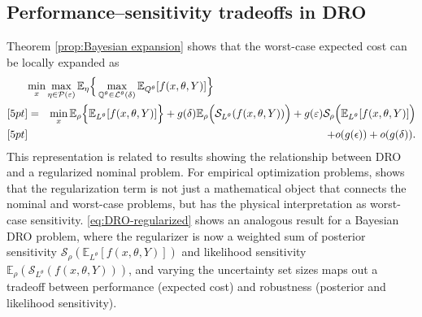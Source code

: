 \documentclass[10pt,a4paper]{amsart}
\newtheorem{remark}[theorem]{Remark}
\numberwithin{equation}{section}
\numberwithin{theorem}{section}
\numberwithin{table}{section}
\numberwithin{figure}{section}
\begin{document}
\subsection{Performance--sensitivity tradeoffs in DRO}
\label{sec:DROtradeoff}

Theorem \ref{prop:Bayesian expansion} shows that the  worst-case expected cost can be locally expanded as
\begin{eqnarray}
\lefteqn{\min_x \max_{\eta \in {\mathcal P}(\varepsilon)} {\mathbb E}_\eta \Big\{\max_{{\mathbb Q}^\theta \in {\mathcal L}^\theta(\delta)} {\mathbb E}_{Q^\theta} [f(x, \theta, Y)] \Big\}}
\label{eq:DRO-regularized}
\\ [5pt]
& = & \min_x {\mathbb E}_\rho\Big\{{\mathbb E}_{L^\theta}[f(x, \theta, Y)]\Big\}+ g(\delta) {\mathbb E}_\rho \Big({\mathcal S}_{L^\theta}(f(x, \theta, Y))\Big) + g(\varepsilon)  {\mathcal S}_\rho\Big({\mathbb E}_{L^\theta}[f(x, \theta, Y)]\Big) 
\nonumber  \\ [5pt] 
& & + o(g({\epsilon})) + o(g({\delta})).
\nonumber
\end{eqnarray}
This representation is related to results showing the relationship between DRO and a regularized nominal problem. For empirical optimization problems, \cite{gotoh2026sensitivity} shows that the regularization term is not just a mathematical object that connects the nominal and worst-case problems, but  has the physical interpretation as worst-case sensitivity. \eqref{eq:DRO-regularized} shows an analogous result for a Bayesian DRO problem, where the regularizer is now a weighted sum of posterior  sensitivity ${\mathcal S}_\rho({\mathbb E}_{L^\theta}[f(x, \theta, Y)])$   and likelihood sensitivity ${\mathbb E}_\rho ({\mathcal S}_{L^\theta}(f(x, \theta, Y)))$, and varying the uncertainty set sizes maps out a tradeoff between performance (expected cost) and robustness (posterior and likelihood sensitivity). 






\end{document}
